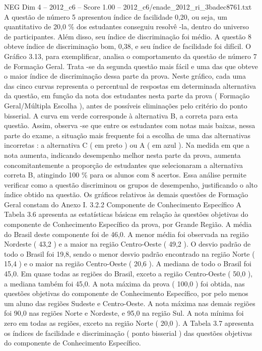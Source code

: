 \begin{textsample}{NEG Dim 4 – 2012\_c6 – Score 1.00 – 2012\_c6/enade\_2012\_ri\_3badec8761.txt}
A questão de número 5 apresentou índice de facilidade 0,20, ou seja, um quantitativo de 20,0 \% dos estudantes conseguiu resolvê -la, dentro do universo de participantes.
Além disso, seu índice de discriminação foi médio.
A questão 8 obteve índice de discriminação bom, 0,38, e seu índice de facilidade foi difícil.
O Gráfico 3.13, para exemplificar, analisa o comportamento da questão de número 7 de Formação Geral.
Trata -se da segunda questão mais fácil e uma das que obteve o maior índice de discriminação dessa parte da prova.
Neste gráfico, cada uma das cinco curvas representa o percentual de respostas em determinada alternativa da questão, em função da nota dos estudantes nesta parte da prova ( Formação Geral/Múltipla Escolha ), antes de possíveis eliminações pelo critério do ponto bisserial.
A curva em verde corresponde à alternativa B, a correta para esta questão.
Assim, observa -se que entre os estudantes com notas mais baixas, nessa parte do exame, a situação mais frequente foi a escolha de uma das alternativas incorretas : a alternativa C ( em preto ) ou A ( em azul ).
Na medida em que a nota aumenta, indicando desempenho melhor nesta parte da prova, aumenta concomitantemente a proporção de estudantes que selecionaram a alternativa correta B, atingindo 100 \% para os alunos com 8 acertos.
Essa análise permite verificar como a questão discriminou os grupos de desempenho, justificando o alto índice obtido na questão.
Os gráficos relativos às demais questões de Formação Geral constam do Anexo I. 3.2.2 Componente de Conhecimento Específico A Tabela 3.6 apresenta as estatísticas básicas em relação às questões objetivas do componente de Conhecimento Específico da prova, por Grande Região.
A média do Brasil deste componente foi de 46,0.
A menor média foi observada na região Nordeste ( 43,2 ) e a maior na região Centro-Oeste ( 49,2 ).
O desvio padrão de todo o Brasil foi 19,8, sendo o menor desvio padrão encontrado na região Norte ( 15,4 ) e o maior na região Centro-Oeste ( 20,6 ).
A mediana de todo o Brasil foi 45,0.
Em quase todas as regiões do Brasil, exceto a região Centro-Oeste ( 50,0 ), a mediana também foi 45,0.
A nota máxima da prova ( 100,0 ) foi obtida, nas questões objetivas do componente de Conhecimento Específico, por pelo menos um aluno das regiões Sudeste e Centro-Oeste.
A nota máxima nas demais regiões foi 90,0 nas regiões Norte e Nordeste, e 95,0 na região Sul.
A nota mínima foi zero em todas as regiões, exceto na região Norte ( 20,0 ).
A Tabela 3.7 apresenta os índices de facilidade e discriminação ( ponto bisserial ) das questões objetivas do componente de Conhecimento Específico.

\end{textsample}
